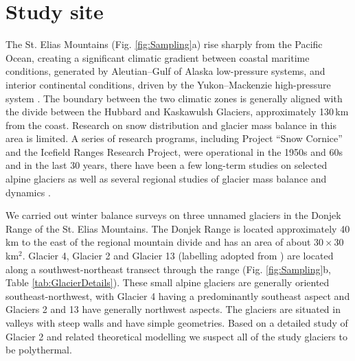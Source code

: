 \documentclass[review,oneside, letterpaper]{igs} %
\begin{document}
\section{Study site}

The St. Elias Mountains (Fig. \ref{fig:Sampling}a) rise sharply from the Pacific Ocean, creating a significant climatic gradient between coastal maritime conditions, generated by Aleutian--Gulf of Alaska low-pressure systems, and interior continental conditions, driven by the Yukon--Mackenzie high-pressure system \citep{Taylor1969}. The boundary between the two climatic zones is generally aligned with the divide between the Hubbard and Kaskawulsh Glaciers, approximately 130\,km from the coast. Research on snow distribution and glacier mass balance in this area is limited. A series of research programs, including Project ``Snow Cornice''  and the Icefield Ranges Research Project, were operational in the 1950s and 60s \citep{Wood1948, Danby2003} and in the last 30 years, there have been a few long-term studies on selected alpine glaciers \citep[e.g.][]{Clarke2014} as well as several regional studies of glacier mass balance and dynamics \citep[e.g.][]{Arendt2008, Burgess2013,Waechter2015}.

We carried out winter balance surveys on three unnamed glaciers in the Donjek Range of the St. Elias Mountains. The Donjek Range is located approximately 40 km to the east of the regional mountain divide and has an area of about $30\times30$\,km$^2$. Glacier 4, Glacier 2 and Glacier 13 (labelling adopted from \cite{Crompton2016}) are located along a southwest-northeast transect through the range (Fig. \ref{fig:Sampling}b, Table \ref{tab:GlacierDetails}). These small alpine glaciers are generally oriented southeast-northwest, with Glacier 4 having a predominantly southeast aspect and Glaciers 2 and 13 have generally northwest aspects. The glaciers are situated in valleys with steep walls and have simple geometries. Based on a detailed study of Glacier 2  \citep{Wilson2013} and related theoretical modelling \citep{Wilson2013a} we suspect all of the study glaciers to be polythermal. 
\end{document}
